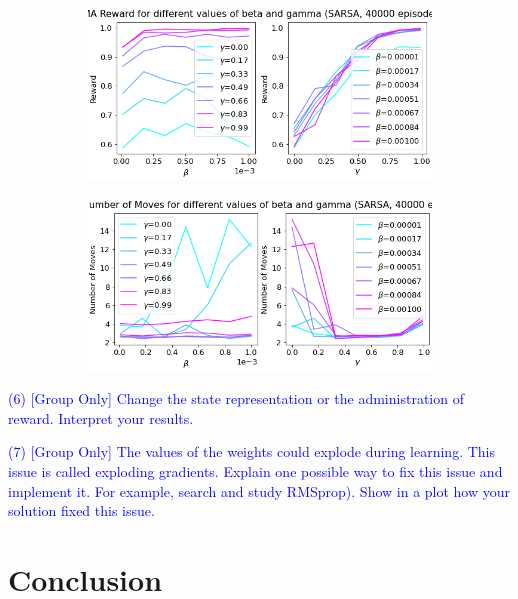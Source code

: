 \documentclass[conference]{IEEEtran}
\begin{document}
\begin{figure}
    \centering
    \begin{subfigure}[]{.5\textwidth}
        \includegraphics[width=\textwidth]{../figures/sarsa_Reward.png}
        \caption{}
    \end{subfigure}
    \begin{subfigure}[]{.5\textwidth}
        \includegraphics[width=\textwidth]{../figures/sarsa_Number of Moves.png}
    \end{subfigure}
    \caption{}
    \label{fig:hyper-parameters}
\end{figure}


\textcolor{blue}{(6) [Group Only] Change the state representation or the administration of reward. Interpret your results.}

\textcolor{blue}{(7) [Group Only] The values of the weights could explode during learning. This
issue is called exploding gradients. Explain one possible way to fix this issue and
implement it. For example, search and study RMSprop). Show in a plot how your
solution fixed this issue.}








\section{Conclusion}\label{sec:conclusion}
\end{document}
